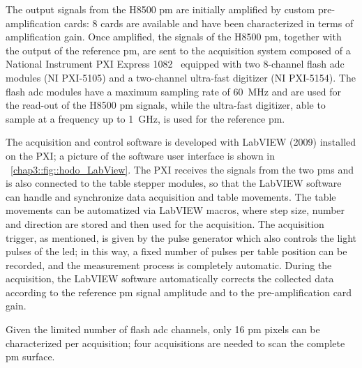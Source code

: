 The output signals from the H8500 \gls{pm} are initially amplified by custom pre-amplification cards: 8 cards are available and have been characterized in terms of amplification gain. Once amplified, the signals of the H8500 \gls{pm}, together with the output of the reference \gls{pm}, are sent to the acquisition system composed of a National Instrument PXI Express 1082~\parencite{NationalInstruments2010} equipped with two 8-channel flash \gls{adc} modules (NI PXI-5105) and a two-channel ultra-fast digitizer (NI PXI-5154). The flash \gls{adc} modules have a maximum sampling rate of 60~MHz and are used for the read-out of the H8500 \gls{pm} signals, while the ultra-fast digitizer, able to sample at a frequency up to 1~GHz, is used for the reference \gls{pm}.

The acquisition and control software is developed with LabVIEW (2009) installed on the PXI; a picture of the software user interface is shown in \figurename~\ref{chap3::fig::hodo_LabView}. The PXI receives the signals from the two \glspl{pm} and is also connected to the table stepper modules, so that the LabVIEW software can handle and synchronize data acquisition and table movements. The table movements can be automatized via LabVIEW macros, where step size, number and direction are stored and then used for the acquisition. The acquisition trigger, as mentioned, is given by the pulse generator which also controls the light pulses of the \gls{led}; in this way, a fixed number of pulses per table position can be recorded, and the measurement process is completely automatic. During the acquisition, the LabVIEW software automatically corrects the collected data according to the reference \gls{pm} signal amplitude and to the pre-amplification card gain.

Given the limited number of flash \gls{adc} channels, only 16 \gls{pm} pixels can be characterized per acquisition; four acquisitions are needed to scan the complete \gls{pm} surface.

